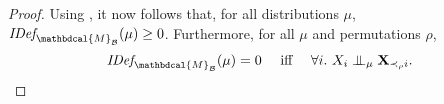 \documentclass[letterpaper]{article} %
\theoremstyle{plain}
\theoremstyle{definition}
\theoremstyle{remark}
\let\H\relax
\DeclareMathOperator{\H}{\mathrm{H}} %
\newcommand{\CI}{\mathrel{\perp\mspace{-10mu}\perp}} %
\newcommand{\dg}[1]{\mathbdcal{#1}}
\newcommand\Pa{\mathbf{Pa}}
\newcommand{\IDef}[1]{\mathit{IDef}_{\!#1}}
\newcommand{\PDGof}[1]{{\dg M}_{#1}}
\begin{document}
\begin{proof}
Using , it now follows that,
for all distributions $\mu$,
$\IDef{\PDGof{\mathcal B}}(\mu) \ge 0$.
Furthermore, for all $\mu$ and permutations $\rho$,
\begin{equation}\label{eq:key}
  \IDef{\PDGof{\mathcal B}}(\mu) = 0 \quad\mbox{ iff }\quad 
    \forall i.~X_i \CI_\mu {\bf X}_{\prec_\rho i}.
\end{equation}


\end{proof}
\end{document}

